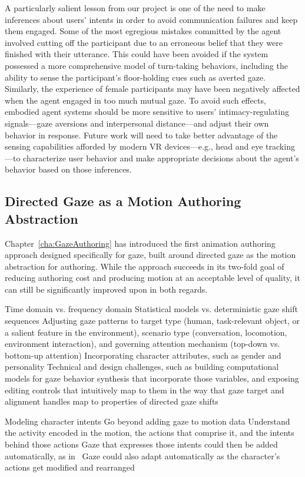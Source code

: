 A particularly salient lesson from our project is one of the need to make inferences about users' intents in order to avoid communication failures and keep them engaged. Some of the most egregious mistakes committed by the agent involved cutting off the participant due to an erroneous belief that they were finished with their utterance. This could have been avoided if the system possessed a more comprehensive model of turn-taking behaviors, including the ability to sense the participant's floor-holding cues such as averted gaze. Similarly, the experience of female participants may have been negatively affected when the agent engaged in too much mutual gaze. To avoid such effects, embodied agent systems should be more sensitive to users' intimacy-regulating signals---gaze aversions and interpersonal distance---and adjust their own behavior in response. Future work will need to take better advantage of the sensing capabilities afforded by modern VR devices---e.g., head and eye tracking---to characterize user behavior and make appropriate decisions about the agent's behavior based on those inferences.

\subsection{Directed Gaze as a Motion Authoring Abstraction}

Chapter~\ref{cha:GazeAuthoring} has introduced the first animation authoring approach designed specifically for gaze, built around directed gaze as the motion abstraction for authoring.
While the approach succeeds in its two-fold goal of reducing authoring cost and producing motion at an acceptable level of quality, it can still be significantly improved upon in both regards.

Time domain vs. frequency domain
Statistical models vs. deterministic gaze shift sequences
Adjusting gaze patterns to target type (human, task-relevant object, or a salient feature in the environment), scenario type (conversation, locomotion, environment interaction), and governing attention mechanism (top-down vs. bottom-up attention)
Incorporating character attributes, such as gender and personality
Technical and design challenges, such as building computational models for gaze behavior synthesis that incorporate those variables, and exposing editing controls that intuitively map to them in the way that gaze target and alignment handles map to properties of directed gaze shifts


Modeling character intents
Go beyond adding gaze to motion data
Understand the activity encoded in the motion, the actions that comprise it, and the intents behind those actions
Gaze that expresses those intents could then be added automatically, as in~\citep{bai2012synthesis}
Gaze could also adapt automatically as the character's actions get modified and rearranged

